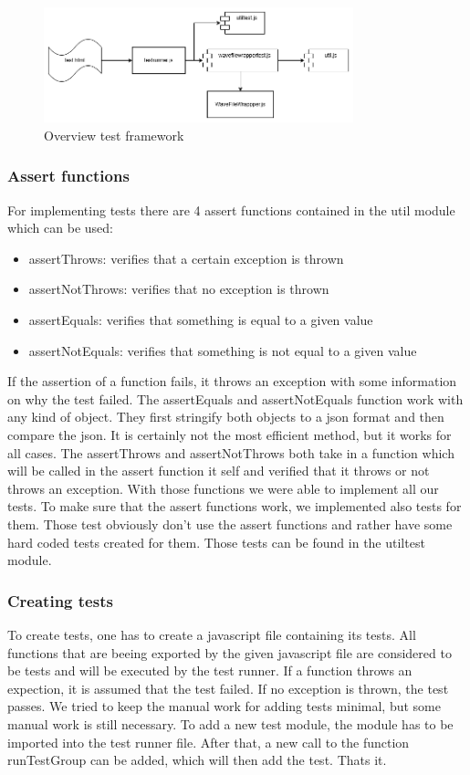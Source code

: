 \begin{figure}[H]
    \centering
    \includegraphics[width=0.8\textwidth]{../assets/overview_test_framework.png}
    \caption{Overview test framework}
\end{figure}

\subsubsection{Assert functions}
For implementing tests there are 4 assert functions contained in the util module which can be used:

\begin{itemize}
    \item assertThrows: verifies that a certain exception is thrown
    \item assertNotThrows: verifies that no exception is thrown
    \item assertEquals: verifies that something is equal to a given value
    \item assertNotEquals: verifies that something is not equal to a given value
\end{itemize}

If the assertion of a function fails, it throws an exception with some information on why the test failed.
The assertEquals and assertNotEquals function work with any kind of object. They first stringify both objects to a json format and then compare the json. It is certainly not the most efficient method, but it works for all cases. The assertThrows and assertNotThrows both take in a function which will be called in the assert function it self and verified that it throws or not throws an exception. With those functions we were able to implement all our tests. 
To make sure that the assert functions work, we implemented also tests for them. Those test obviously don't use the assert functions and rather have some hard coded tests created for them. Those tests can be found in the utiltest module.

\subsubsection{Creating tests}
To create tests, one has to create a javascript file containing its tests. All functions that are beeing exported by the given javascript file are considered to be tests and will be executed by the test runner. If a function throws an expection, it is assumed that the test failed. If no exception is thrown, the test passes. 
We tried to keep the manual work for adding tests minimal, but some manual work is still necessary. To add a new test module, the module has to be imported into the test runner file. After that, a new call to the function runTestGroup can be added, which will then add the test. Thats it.

